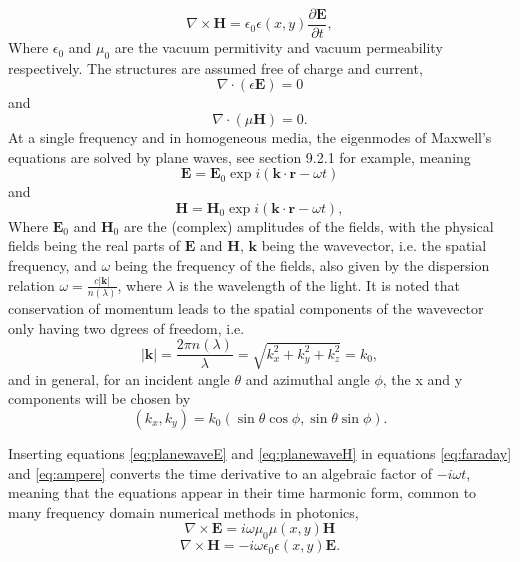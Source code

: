 \begin{equation}
\label{eq:ampere}
\nabla \times \mathbf{H} = \epsilon_0\epsilon(x,y)\frac{\partial\mathbf{E}}{\partial t},
\end{equation}
Where $\epsilon_0$ and $\mu_0$ are the vacuum permitivity and vacuum permeability respectively. The structures are assumed free of charge and current,
$$
\nabla \cdot (\epsilon \mathbf{E}) = 0
$$
and
$$
\nabla \cdot (\mu \mathbf{H}) = 0.
$$
At a single frequency and in homogeneous media, the eigenmodes of Maxwell's equations are solved by plane waves, see \cite{griffiths} section 9.2.1 for example,
meaning
\begin{equation}
\label{eq:planewaveE}
\mathbf{E} = \mathbf{E}_0 \exp{i(\mathbf{k}\cdot\mathbf{r} - \omega t)}
\end{equation}
and
\begin{equation}
\label{eq:planewaveH}
\mathbf{H} = \mathbf{H}_0 \exp{i(\mathbf{k}\cdot\mathbf{r} - \omega t)},
\end{equation}
Where $\mathbf{E}_0$ and $\mathbf{H}_0$ are the (complex) amplitudes of the fields, with the physical fields being the real parts of
$\mathbf{E}$ and $\mathbf{H}$, $\mathbf{k}$ being the wavevector, i.e. the spatial frequency, and $\omega$ being the frequency of the fields, also given by the dispersion relation
$\omega = \frac{c|\mathbf{k}|}{n(\lambda)}$, where $\lambda$ is the wavelength of the light.
It is noted that conservation of momentum leads to the spatial components of the wavevector only having two dgrees of freedom, i.e.
\begin{equation}
\label{eq:dispersionk}
|\mathbf{k}| = \frac{2\pi n(\lambda)}{\lambda} = \sqrt{k_x^2+k_y^2+k_z^2} = k_0,
\end{equation}
and in general, for an incident angle $\theta$ and azimuthal angle $\phi$, the x and y components will be chosen by
\begin{equation}
\label{eq:inc_ang_k}
(k_x,k_y) = k_0(\sin{\theta}\cos{\phi},\sin{\theta}\sin{\phi}).
\end{equation}

Inserting equations \ref{eq:planewaveE} and \ref{eq:planewaveH} in equations \ref{eq:faraday} and \ref{eq:ampere} converts the time derivative to
an algebraic factor of $-i\omega t$, meaning that the equations appear in their time harmonic form, common to many frequency domain numerical methods in photonics,
\begin{equation}
\label{eq:THfaraday}
\nabla \times \mathbf{E} = i\omega\mu_0\mu(x,y)\mathbf{H}
\end{equation}
\begin{equation}
\label{eq:THampere}
\nabla \times \mathbf{H} = -i\omega\epsilon_0\epsilon(x,y)\mathbf{E}.
\end{equation}



